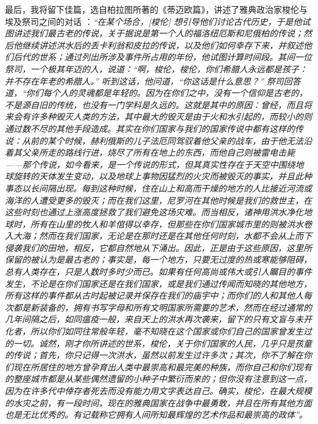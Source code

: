 \documentclass[10pt,twocolumn,letterpaper]{article}
\begin{document}
最后，我将留下佳篇，选自柏拉图所著的《蒂迈欧篇》，讲述了雅典政治家梭伦与埃及祭司之间的对话 \cite{140}：\textit{“在某个场合，[梭伦] 想引导他们讨论古代历史，于是他试图讲述我们最古老的传说，关于据说是第一个人的福洛纽厄斯和尼俄柏的传说；然后他继续讲述洪水后的丢卡利翁和皮拉的传说，以及他们如何幸存下来，并叙述他们后代的世系；通过列出所涉及事件所占用的年份，他试图计算时间段。其间一位祭司，一个极其年迈的人，说道：“啊，梭伦，梭伦，你们希腊人永远都是孩子：并不存在年老的希腊人。” 听到这话，他问道，“你这话是什么意思？” 祭司回答道，“你们每个人的灵魂都是年轻的。因为在你们之中，没有一个信仰是古老的，不是源自旧的传统，也没有一门学科是久远的。这就是其中的原因：曾经，而且将来会有许多种毁灭人类的方法，其中最大的毁灭是由于火和水引起的，而较小的则通过数不尽的其他手段造成。其实在你们国家与我们的国家传说中都有这样的传说：从前的某个时候，赫利俄斯的儿子法厄同驾驭着他父亲的战车，由于他无法沿着其父亲所走的路线行进，烧尽了所有在地上的东西，而他自己则被雷电击毙——那个传说，如今看来，是一个传说的形式，但其真实性存在于天空中围绕地球旋转的天体发生变动，以及地球上事物因猛烈的火灾而被毁灭的事实，并且此种事态以长间隔出现。每到这种时候，住在山上和高而干燥的地方的人比接近河流或海洋的人遭受更多的毁灭；而在我们这里，尼罗河在其他时候是我们的救世主，在这些时刻也通过上涨高度拯救了我们避免这场灾难。而当相反，诸神用洪水净化地球时，所有在山里的牧人和羊倌得以幸存，但那些在你们国家城市里的则被洪水卷入大海；然而在我们国家，无论是在那时还是在其他任何时刻，水都不会从上而下侵袭我们的田地，相反，它都自然地从下涌出。因此，正是由于这些原因，这里所保留的被认为是最古老的；事实是，每一个地方，只要无过度的热或寒能够阻碍，总有人类存在，只是人数时多时少而已。如果有任何高尚或伟大或引人瞩目的事件发生，不论是在你们国家还是在我们国家，或是我们通过传闻而知晓的其他地方，所有这样的事件都从古时起被记录并保存在我们的庙宇中；而你们的人和其他人每次都是新装备的，拥有书写字母和所有文明国家所需要的艺术，然而在经过通常的几年间隔之后，如同瘟疫一般，来自天上的洪水再次袭来，留下的只有文盲与未开化者，所以你们如同往常般年轻，毫不知晓在这个国家或你们自己的国家曾发生过的一切。诚然，刚才你所讲述的世系，梭伦，关于你们国家的人民，几乎只是孩童的传说；首先，你只记得一次洪水，虽然以前发生过许多次；其次，你不了解在你们现在所居住的地方曾孕育出人类中最崇高和最完美的种族，而你自己和你们现有的整座城市都是从某些偶然遗留的小种子中繁衍而来的；但你没有注意到这一点，因为在许多代中倖存者死去而没有能力用文字表达自己。确实，梭伦，在最大规模的水灾之前，有一段时间，现在的雅典国家在战争中最勇敢，并且在所有其他方面也是无比优秀的。有记载称它拥有人间所知最辉煌的艺术作品和最崇高的政体”。}
\end{document}
